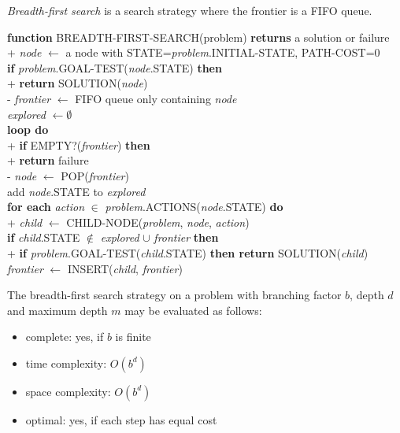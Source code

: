 \documentclass{article}
\begin{document}
\begin{definition}
    \emph{Breadth-first search} is a search strategy where
    the frontier is a FIFO queue.
    \begin{pseudo}
    \textbf{function} BREADTH-FIRST-SEARCH(problem) \textbf{returns} a solution or failure  \\+
        \emph{node} $\leftarrow$ a node with STATE=\emph{problem}.INITIAL-STATE, PATH-COST=0\\
        \textbf{if} \emph{problem}.GOAL-TEST(\emph{node}.STATE) \textbf{then}               \\+
            \textbf{return} SOLUTION(\emph{node})                                           \\-
        \emph{frontier} $\leftarrow$ FIFO queue only containing \emph{node}                 \\
        \emph{explored} $\leftarrow \emptyset$                                              \\
        \textbf{loop do}                                                                    \\+
            \textbf{if} EMPTY?(\emph{frontier}) \textbf{then}                               \\+
                \textbf{return} failure                                                     \\-
            \emph{node} $\leftarrow$ POP(\emph{frontier})                                   \\
            add \emph{node}.STATE to \emph{explored}                                        \\
            \textbf{for each} \emph{action} $\in$ \emph{problem}.ACTIONS(\emph{node}.STATE) \textbf{do}             \\+
                \emph{child} $\leftarrow$ CHILD-NODE(\emph{problem}, \emph{node}, \emph{action})                    \\
                \textbf{if} \emph{child}.STATE $\not\in$ \emph{explored} $\cup$ \emph{frontier} \textbf{then}       \\+
                \textbf{if} \emph{problem}.GOAL-TEST(\emph{child}.STATE) \textbf{then return} SOLUTION(\emph{child})\\
                \emph{frontier} $\leftarrow$ INSERT(\emph{child}, \emph{frontier})
    \end{pseudo}
\end{definition}

\begin{theorem}
    The breadth-first search strategy on a problem with branching factor $b$,
    depth $d$ and maximum depth $m$ may be evaluated as follows:
    \begin{itemize}
        \item complete: yes, if $b$ is finite
        \item time complexity: $O(b^d)$
        \item space complexity: $O(b^d)$
        \item optimal: yes, if each step has equal cost
    \end{itemize}
\end{theorem}
\end{document}

